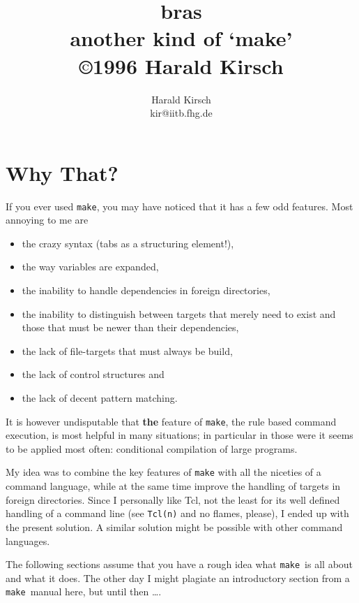 \documentclass[12pt]{article}
\title{\textsf{bras}\\
another kind of `make'\\
\small \copyright 1996 Harald Kirsch}
\author{\relax
Harald Kirsch\\
kir@iitb.fhg.de}
\newcommand{\make}{\texttt{make}}
\begin{document}
\maketitle
\tableofcontents

\section{Why That?}
If you ever used \texttt{make}, you may have noticed that it has a few
odd features. Most annoying to me are
\begin{itemize}
\item the crazy syntax (tabs as a structuring element!),
\item the way variables are expanded,
\item the inability to handle dependencies in foreign directories,
\item the inability to distinguish between targets that merely need to
  exist and those that must be newer than their dependencies,
\item the lack of file-targets that must always be build,
\item the lack of control structures and 
\item the lack of decent pattern matching.
\end{itemize}

It is however undisputable that \textbf{the} feature of \texttt{make},
the rule based command execution, is most helpful in many situations;
in particular in those were it seems to be applied most often:
conditional compilation of large programs.

My idea was to combine the key features of \texttt{make} with all the
niceties of a command language, while at the same time improve the
handling of targets in foreign directories. Since I personally like
Tcl, not the least for its well defined handling of a command line
(see \texttt{Tcl(n)} and no flames, please), I
ended up with the present solution. A similar solution might be
possible with other command languages.

The following sections assume that you have a rough idea what \make\
is all about and what it does. The other day I might plagiate an
introductory section from a \make\ manual here, but until then \ldots.

\end{document}
